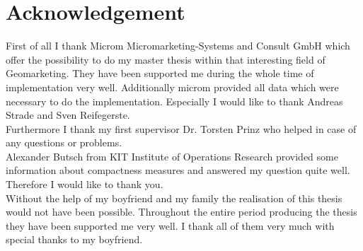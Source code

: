 \section*{Acknowledgement}

First of all I thank Microm Micromarketing-Systems and Consult GmbH which offer the possibility to do my master thesis within that interesting field of Geomarketing. They have been supported me during the whole time of implementation very well. Additionally microm provided all data which were necessary to do the implementation. Especially I would like to thank Andreas Strade and Sven Reifegerste. \\
Furthermore I thank my first supervisor Dr. Torsten Prinz who helped in case of any questions or problems.\\
Alexander Butsch from KIT Institute of Operations Research provided some information about compactness measures and answered my question quite well. Therefore I would like to thank you.\\
Without the help of my boyfriend and my family the realisation of this thesis would not have been possible. Throughout the entire period producing the thesis they have been supported me very well. I thank all of them very much with special thanks to my boyfriend.
